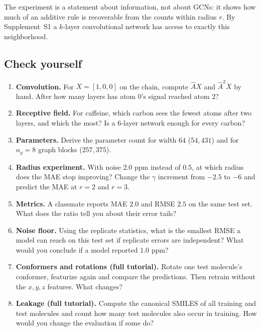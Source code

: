 \documentclass[11pt]{article}
\newcommand{\Ah}{\hat{A}}
\begin{document}
The experiment is a statement about information, not about GCNs: it shows how much of an additive rule is recoverable from the counts within radius $r$. By Supplement~S1 a $k$-layer convolutional network has access to exactly this neighborhood.

\subsection*{Check yourself}
\begin{enumerate}
  \item \textbf{Convolution.} For $X=[1,0,0]$ on the chain, compute $\Ah X$ and $\Ah^2X$ by hand. After how many layers has atom 0's signal reached atom 2?
  \item \textbf{Receptive field.} For caffeine, which carbon sees the fewest atoms after two layers, and which the most? Is a $6$-layer network enough for every carbon?
  \item \textbf{Parameters.} Derive the parameter count for width $64$ ($54{,}431$) and for $n_g=8$ graph blocks ($257{,}375$).
  \item \textbf{Radius experiment.} With noise $2.0$ ppm instead of $0.5$, at which radius does the MAE stop improving? Change the $\gamma$ increment from $-2.5$ to $-6$ and predict the MAE at $r=2$ and $r=3$.
  \item \textbf{Metrics.} A classmate reports MAE $2.0$ and RMSE $2.5$ on the same test set. What does the ratio tell you about their error tails?
  \item \textbf{Noise floor.} Using the replicate statistics, what is the smallest RMSE a model can reach on this test set if replicate errors are independent? What would you conclude if a model reported $1.0$ ppm?
  \item \textbf{Conformers and rotations (full tutorial).} Rotate one test molecule's conformer, featurize again and compare the predictions. Then retrain without the $x,y,z$ features. What changes?
  \item \textbf{Leakage (full tutorial).} Compute the canonical SMILES of all training and test molecules and count how many test molecules also occur in training. How would you change the evaluation if some do?
\end{enumerate}
\end{document}
